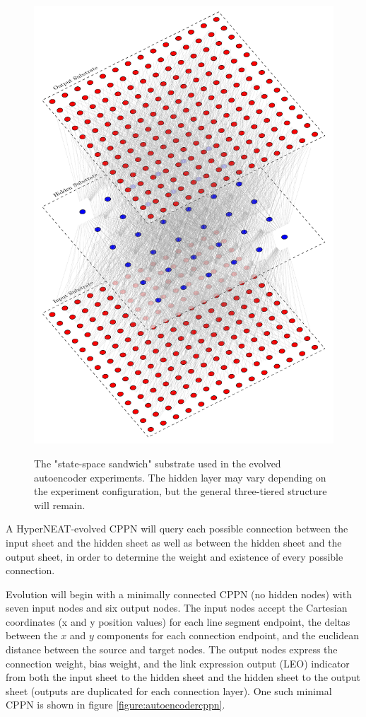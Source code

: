 \documentclass{acm_proc_article-sp}
\begin{document}
\begin{figure}[h]
	\caption{The "state-space sandwich" substrate used in the evolved autoencoder experiments.  The hidden layer may vary depending on the experiment configuration, but the general three-tiered structure will remain.}
	\centering
	\includegraphics[scale=0.55]{SubstrateConfiguration/AutoencoderSubstrate}
	\label{figure:autoencodersubstrate}
\end{figure}

A HyperNEAT-evolved CPPN will query each possible connection between the input sheet and the hidden sheet as well as between the hidden sheet and the output sheet, in order to determine the weight and existence of every possible connection.

Evolution will begin with a minimally connected CPPN (no hidden nodes) with seven input nodes and six output nodes.  The input nodes accept the Cartesian coordinates (x and y position values) for each line segment endpoint, the deltas between the $x$ and $y$ components for each connection endpoint, and the euclidean distance between the source and target nodes.  The output nodes express the connection weight, bias weight, and the link expression output (LEO) indicator from both the input sheet to the hidden sheet and the hidden sheet to the output sheet (outputs are duplicated for each connection layer).  One such minimal CPPN is shown in figure \ref{figure:autoencodercppn}.
\end{document}
